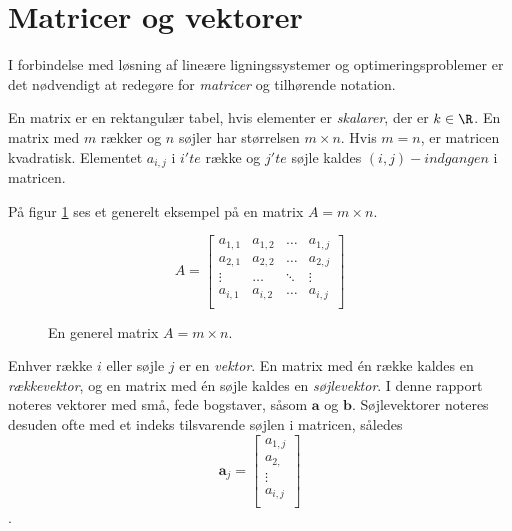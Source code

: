 \section{Matricer og vektorer}


I forbindelse med løsning af lineære ligningssystemer og optimeringsproblemer er det nødvendigt at redegøre for \textit{matricer} og tilhørende notation. 

\begin{defn}{}{}
En matrix er en rektangulær tabel, hvis elementer er \textit{skalarer}, der er $k \in \R$. 
En matrix med $m$ rækker og $n$ søjler har størrelsen $m \times n$.
Hvis $m=n$, er matricen kvadratisk. 
Elementet $a_{i,j}$ i $i'te$ række og $j'te$ søjle kaldes $(i,j)-indgangen$ i matricen. 
\end{defn}


På figur \ref{fig:matrix_gen_eks} ses et generelt eksempel på en matrix $A = m \times n$.

\begin{figure}[H]
	\begin{center}
$$
A=
\begin{bmatrix}
a_{1,1} & a_{1,2} & \ldots & a_{1,j} \\
a_{2,1} & a_{2,2} & \ldots & a_{2,j} \\
\vdots  & \ldots  & \ddots & \vdots \\
a_{i,1} & a_{i,2} & \ldots & a_{i,j} \\
\end{bmatrix}
$$
	\end{center}
	\caption{En generel matrix $A=m \times n$.}
	\label{fig:matrix_gen_eks}
\end{figure}

Enhver række $i$ eller søjle $j$ er en \textit{vektor}. En matrix med én række kaldes en \textit{rækkevektor}, og en matrix med én søjle kaldes en \textit{søjlevektor}. I denne rapport noteres vektorer med små, fede bogstaver, såsom $\textbf{a}$ og $\textbf{b}$. Søjlevektorer noteres desuden ofte med et indeks tilsvarende søjlen i matricen, således 
$$
\textbf{a}_j= 
\begin{bmatrix}
a_{1,j} \\
a_{2,} \\
\vdots \\
a_{i,j} \\
\end{bmatrix}
$$. 










